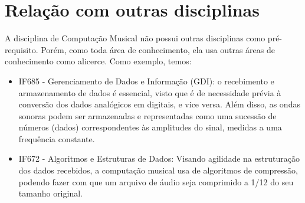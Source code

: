 \documentclass[10pt]{article}
\begin{document}
\section {Relação com outras disciplinas}
\hspace {0,5in} A disciplina de Computação Musical não possui outras disciplinas como pré-requisito. Porém, como toda área de conhecimento, ela usa outras áreas de conhecimento como alicerce. Como exemplo, temos:\begin{itemize}
    \item IF685 - Gerenciamento de Dados e Informação (GDI): o recebimento e armazenamento de dados é essencial, visto que é de necessidade prévia à conversão dos dados analógicos em digitais, e vice versa. Além disso, as ondas sonoras podem ser armazenadas e representadas como uma sucessão de números (dados) correspondentes às amplitudes do sinal, medidas a uma frequência constante.
    \item IF672 - Algoritmos e Estruturas de Dados: Visando agilidade na estruturação dos dados recebidos, a computação musical usa de algoritmos de compressão, podendo fazer com que um arquivo de áudio seja comprimido a 1/12 \hspace{0.01in}\cite{intromusical} do seu tamanho original.
\end{itemize}


\end{document}
